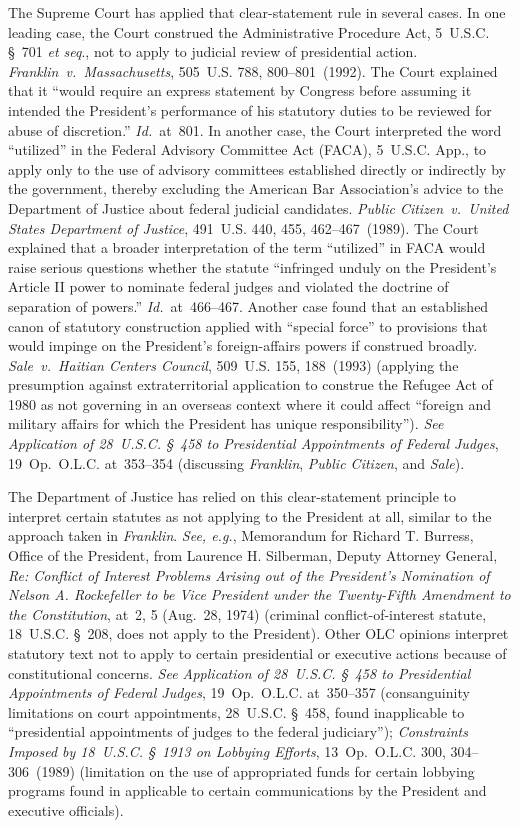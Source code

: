 The Supreme Court has applied that clear-statement rule in several cases.
In one leading case, the Court construed the Administrative Procedure Act, 5~U.S.C. \S~701 \textit{et seq}., not to apply to judicial review of presidential action.
\textit{Franklin~v.\ Massachusetts}, 505~U.S. 788, 800--801~(1992).
The Court explained that it ``would require an express statement by Congress before assuming it intended the President's performance of his statutory duties to be reviewed for abuse of discretion.''
\textit{Id.}~at~801.
In another case, the Court interpreted the word ``utilized'' in the Federal Advisory Committee Act (FACA), 5~U.S.C. App., to apply only to the use of advisory committees established directly or indirectly by the government, thereby excluding the American Bar Association's advice to the Department of Justice about federal judicial candidates.
\textit{Public Citizen~v.\ United States Department of Justice}, 491~U.S. 440, 455, 462--467~(1989).
The Court explained that a broader interpretation of the term ``utilized'' in FACA would raise serious questions whether the statute ``infringed unduly on the President's Article II power to nominate federal judges and violated the doctrine of separation of powers.''
\textit{Id.}~at~466--467.
Another case found that an established canon of statutory construction applied with ``special force'' to provisions that would impinge on the President's foreign-affairs powers if construed broadly.
\textit{Sale~v.\ Haitian Centers Council}, 509~U.S. 155, 188~(1993) (applying the presumption against extraterritorial application to construe the Refugee Act of 1980 as not governing in an overseas context where it could affect ``foreign and military affairs for which the President has unique responsibility'').
\textit{See Application of 28~U.S.C. \S~458 to Presidential Appointments of Federal Judges}, 19~Op.\ O.L.C. at~353--354 (discussing \textit{Franklin}, \textit{Public Citizen}, and \textit{Sale}).

The Department of Justice has relied on this clear-statement principle to interpret certain statutes as not applying to the President at all, similar to the approach taken in \textit{Franklin}.
\textit{See, e.g.}, Memorandum for Richard T. Burress, Office of the President, from Laurence H. Silberman, Deputy Attorney General, \textit{Re: Conflict of Interest Problems Arising out of the President's Nomination of Nelson A. Rockefeller to be Vice President under the Twenty-Fifth Amendment to the Constitution}, at~2, 5 (Aug.~28, 1974) (criminal conflict-of-interest statute, 18~U.S.C. \S~208, does not apply to the President).
Other OLC opinions interpret statutory text not to apply to certain presidential or executive actions because of constitutional concerns.
\textit{See Application of 28~U.S.C. \S~458 to Presidential Appointments of Federal Judges}, 19~Op.\ O.L.C. at~350--357 (consanguinity limitations on court appointments, 28~U.S.C. \S~458, found inapplicable to ``presidential appointments of judges to the federal judiciary'');
\textit{Constraints Imposed by 18~U.S.C. \S~1913 on Lobbying Efforts}, 13~Op.\ O.L.C. 300, 304--306~(1989) (limitation on the use of appropriated funds for certain lobbying programs found in applicable to certain communications by the President and executive officials).

